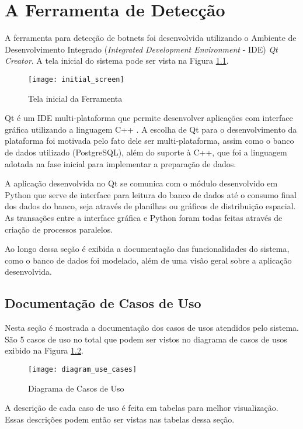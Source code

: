 \chapter{A Ferramenta de Detecção} \label{ch:tool}
A ferramenta para detecção de botnets foi desenvolvida utilizando o Ambiente de Desenvolvimento Integrado (\textit{Integrated Development Environment} - IDE) \textit{Qt Creator}. A tela inicial do sistema pode ser vista na Figura \ref{fig:initial_screen}.

\begin{figure}
\centering
\texttt{[image: initial\_screen]}
\caption[Tela inicial da Ferramenta]{Tela inicial da Ferramenta} \label{fig:initial_screen}
\end{figure}

Qt é um IDE multi-plataforma que permite desenvolver aplicações com interface gráfica utilizando a linguagem C++ \citep{qtsite}. A escolha de Qt para o desenvolvimento da plataforma foi motivada pelo fato dele ser multi-plataforma, assim como o banco de dados utilizado (PostgreSQL), além do suporte à C++, que foi a linguagem adotada na fase inicial para implementar a preparação de dados.

A aplicação desenvolvida no Qt se comunica com o módulo desenvolvido em Python que serve de interface para leitura do banco de dados até o consumo final dos dados do banco, seja através de planilhas ou gráficos de distribuição espacial. As transações entre a interface gráfica e Python foram todas feitas através de criação de processos paralelos.

Ao longo dessa seção é exibida a documentação das funcionalidades do sistema, como o banco de dados foi modelado, além de uma visão geral sobre a aplicação desenvolvida.

\section{Documentação de Casos de Uso}
Nesta seção é mostrada a documentação dos casos de usos atendidos pelo sistema. São 5 casos de uso no total que podem ser vistos no diagrama de casos de usos exibido na Figura \ref{fig:diagram_use_cases}. 

\begin{figure}
\centering
\texttt{[image: diagram\_use\_cases]}
\caption[Diagrama de Casos de Uso]{Diagrama de Casos de Uso} \label{fig:diagram_use_cases}
\end{figure}

A descrição de cada caso de uso é feita em tabelas para melhor visualização. Essas descrições podem então ser vistas nas tabelas dessa seção. 

